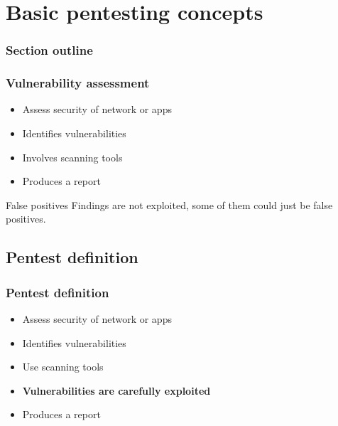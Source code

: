 \section{Basic pentesting concepts}

\begin{frame}
    \frametitle{Section outline}

    \tableofcontents[currentsubsection, hideothersubsections, sectionstyle=show/hide]
\end{frame}


\begin{frame}
    \frametitle{Vulnerability assessment}
    
    \note[item]{
    }
    
    \begin{itemize}
    		\item Assess security of network or apps
    		\item Identifies vulnerabilities
    		\item Involves scanning tools
    		\item Produces a report
    \end{itemize}

    \pause
    
    \begin{alertblock}{False positives}
	Findings are not exploited, some of them could just be false positives.
    \end{alertblock}
\end{frame}

\subsection{Pentest definition}

\begin{frame}
    \frametitle{Pentest definition}

    \note[item]{
    }

	\begin{itemize}
    		\item Assess security of network or apps
    		\item Identifies vulnerabilities
    		\item Use scanning tools
		\item \textbf{Vulnerabilities are carefully exploited}
    		\item Produces a report
	\end{itemize}	    
\end{frame}

